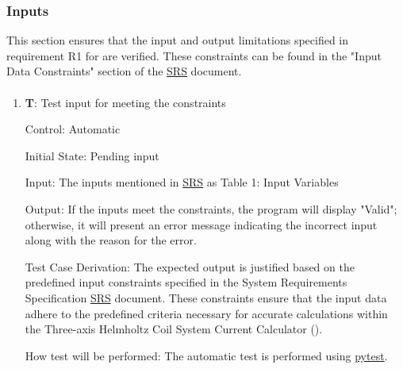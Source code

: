 \documentclass[12pt, titlepage]{article}
\newcounter{testCase}
\newcommand{\testCaseFormat}{T\thetestCase}
\begin{document}
\subsubsection{Inputs}\label{subsec:Inputs}
This section ensures that the input and output limitations specified in requirement R1 for \progname{} are verified. These constraints can be found in the "Input Data Constraints" section of the \href{https://github.com/rnorouziani/Helmholtz-Coil-Current-Calculator-CAS741/blob/main/docs/SRS/SRS.pdf}{SRS} document. 
		
\paragraph{ }

\begin{enumerate}

\item{\textbf{\testCaseFormat \label{T_input1}}: Test input for meeting the constraints}


Control: Automatic
					
Initial State: Pending input
					
Input: The inputs mentioned in \href{https://github.com/rnorouziani/Helmholtz-Coil-Current-Calculator-CAS741/blob/main/docs/SRS/SRS.pdf}{SRS} as Table 1: Input Variables
					
Output: If the inputs meet the constraints, the program will display "Valid"; otherwise, it will present an error message indicating the incorrect input along with the reason for the error.

Test Case Derivation: The expected output is justified based on the predefined input constraints specified in the System Requirements Specification \href{https://github.com/rnorouziani/Helmholtz-Coil-Current-Calculator-CAS741/blob/main/docs/SRS/SRS.pdf}{SRS} document. These constraints ensure that the input data adhere to the predefined criteria necessary for accurate calculations within the Three-axis Helmholtz Coil System Current Calculator (\progname{}).	
			
How test will be performed: The automatic test is performed using \href{https://docs.pytest.org/en/8.0.x/}{pytest}.
					
\end{enumerate}
\end{document}
